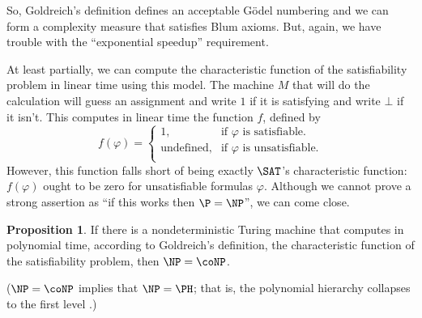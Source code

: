 \documentclass[12pt]{article}
\theoremstyle{definition}
\newtheorem{proposition}[definition]{Proposition}
\begin{document}
So, Goldreich's definition defines an acceptable Gödel numbering
and we can form a complexity measure that satisfies Blum axioms.
But, again,
we have trouble with the ``exponential speedup'' requirement.

At least partially,
we can compute the characteristic function of the satisfiability problem
in linear time using this model.
The machine $M$ that will do the calculation will guess an assignment
and write $1$ if it is satisfying and write $\bot$ if it isn't.
This computes in linear time the function $f$, defined by
\begin{equation*}
    f(\varphi) = \begin{cases}
        1, & \text{if $\varphi$ is satisfiable.} \\
        \text{undefined}, & \text{if $\varphi$ is unsatisfiable.} \\
    \end{cases}
\end{equation*}
However,
this function falls short of being exactly $\SAT$'s characteristic function:
$f(\varphi)$ ought to be zero for unsatisfiable formulas $\varphi$.
Although we cannot prove a strong assertion as
``if this works then $\P = \NP$'',
we can come close.

\begin{proposition}
    If there is a nondeterministic Turing machine
    that computes in polynomial time, according to Goldreich's definition,
    the characteristic function of the satisfiability problem,
    then $\NP = \coNP$.
\end{proposition}

($\NP = \coNP$ implies that $\NP = \PH$; that is,
the polynomial hierarchy collapses to the first level \cite[p.~280]{Kozen2006}.)
\end{document}
